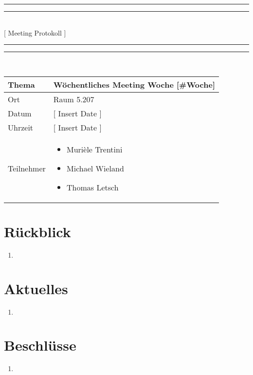 \documentclass[11pt, a4paper,oneside]{scrartcl}
\begin{document}
\centering
\rule{\textwidth}{1.6pt}\vspace*{-\baselineskip}\vspace*{2pt} %
\rule{\textwidth}{0.4pt}\\[\baselineskip] %
{\LARGE [ Meeting Protokoll ]}\\[0.2\baselineskip] %
\rule{\textwidth}{0.4pt}\vspace*{-\baselineskip}\vspace{3.2pt} %
\rule{\textwidth}{1.6pt}\\[2\baselineskip] %

\begin{tabu} to \linewidth {l X }
	\toprule
	\textbf{Thema} & \textbf{Wöchentliches Meeting Woche [\#Woche]} \\
	\midrule
	Ort & Raum 5.207 \\
	Datum & [ Insert Date ] \\
	Uhrzeit & [ Insert Date ] \\
	Teilnehmer & 
	\begin{minipage}[t]{\textwidth}
	  	\begin{itemize}
			\item Murièle Trentini
			\item Michael Wieland
			\item Thomas Letsch
	  	\end{itemize}
	\end{minipage}
	\\
	\bottomrule
\end{tabu}



\section{Rückblick}
\begin{enumerate}
	\item 
\end{enumerate}

\section{Aktuelles}
\begin{enumerate}
	\item 
\end{enumerate}

\section{Beschlüsse}
\begin{enumerate}
	\item 
\end{enumerate}
\end{document}
